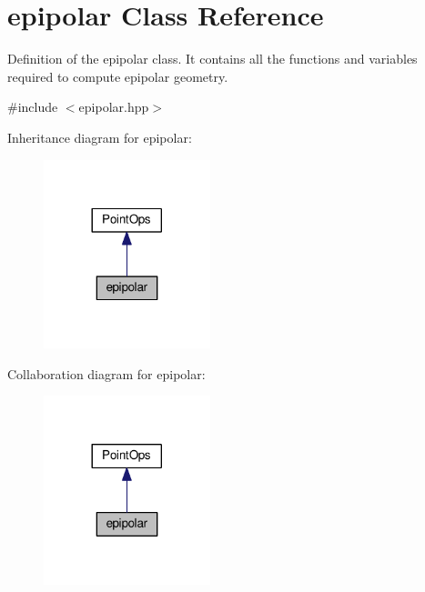 \hypertarget{classepipolar}{}\section{epipolar Class Reference}
\label{classepipolar}


Definition of the epipolar class. It contains all the functions and variables required to compute epipolar geometry.  




{\ttfamily \#include $<$epipolar.\+hpp$>$}



Inheritance diagram for epipolar\+:\nopagebreak
\begin{figure}[H]
\begin{center}
\leavevmode
\includegraphics[width=137pt]{classepipolar__inherit__graph}
\end{center}
\end{figure}


Collaboration diagram for epipolar\+:\nopagebreak
\begin{figure}[H]
\begin{center}
\leavevmode
\includegraphics[width=137pt]{classepipolar__coll__graph}
\end{center}
\end{figure}
